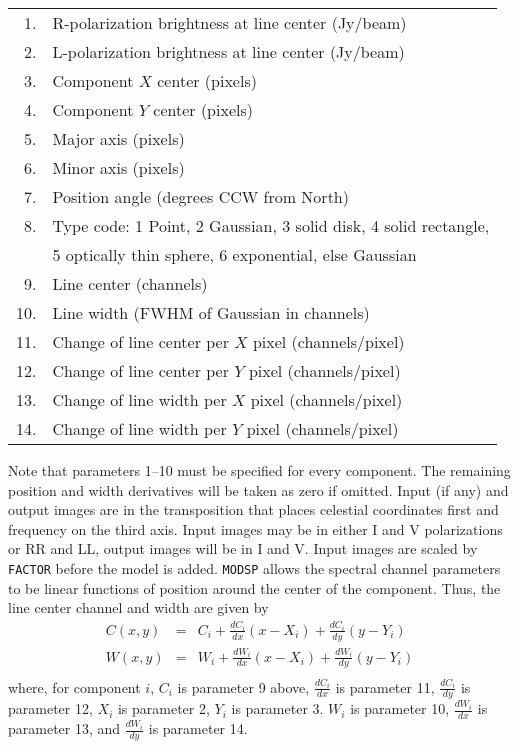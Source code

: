 \documentclass[twoside]{article}
\begin{document}
\begin{center}
\begin{tabular}{|r|l|}\hline
 1. & R-polarization brightness at line center (Jy/beam)\\
 2. & L-polarization brightness at line center (Jy/beam)\\
 3. & Component $X$ center (pixels)\\
 4. & Component $Y$ center (pixels)\\
 5. & Major axis (pixels)\\
 6. & Minor axis (pixels)\\
 7. & Position angle (degrees CCW from North)\\
 8. & Type code: 1 Point, 2 Gaussian, 3 solid disk, 4 solid rectangle,\\
    & 5 optically thin sphere, 6 exponential, else Gaussian\\
 9. & Line center (channels)\\
10. & Line width (FWHM of Gaussian in channels)\\
11. & Change of line center per $X$ pixel (channels/pixel)\\
12. & Change of line center per $Y$ pixel (channels/pixel)\\
13. & Change of line width per $X$ pixel (channels/pixel)\\
14. & Change of line width per $Y$ pixel (channels/pixel)\\ \hline
\end{tabular}
\end{center}

Note that parameters 1--10 must be specified for every component.  The
remaining position and width derivatives will be taken as zero if
omitted.  Input (if any) and output images are in the transposition
that places celestial coordinates first and frequency on the third
axis.  Input images may be in either I and V polarizations or RR and
LL, output images will be in I and V.  Input images are scaled by {\tt
  FACTOR} before the model is added.  {\tt MODSP} allows the spectral
channel parameters to be linear functions of position around the
center of the component.  Thus, the line center channel and width are
given by
\begin{eqnarray*}
  C(x,y) & = & C_i + \frac{dC_i}{dx} (x - X_i) +
                     \frac{dC_i}{dy} (y - Y_i) \\
  W(x,y) & = & W_i + \frac{dW_i}{dx} (x - X_i) +
                     \frac{dW_i}{dy} (y - Y_i) \\
\end{eqnarray*}
where, for component $i$, $C_i$ is parameter 9 above,
$\frac{dC_i}{dx}$ is parameter 11, $\frac{dC_i}{dy}$ is parameter 12,
$X_i$ is parameter 2, $Y_i$ is parameter 3. $W_i$ is parameter 10,
$\frac{dW_i}{dx}$ is parameter 13, and $\frac{dW_i}{dy}$ is parameter
14.
\end{document}
